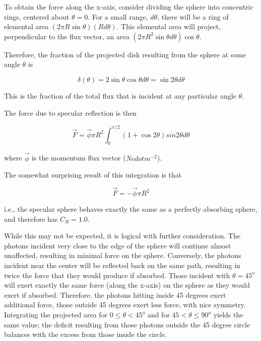 To obtain the force along the x-axis, consider dividing the sphere
into concentric rings, centered about $\theta = 0$.  For a small
range, $d\theta$, there will be a ring of elemental area
$(2 \pi R \sin \theta)(R d\theta)$.  This elemental area will
project, perpendicular to the flux vector, an area
$(2 \pi R^2 \sin \theta d \theta) \cos \theta$.

Therefore, the fraction of the projected disk resulting from the
sphere at some angle $\theta$ is

\begin{equation*}
\delta(\theta) = 2 \sin \theta \cos \theta d \theta = \sin 2 \theta d \theta
\end{equation*}

This is the fraction of the total flux that is incident at any
particular angle $\theta$.

The force due to specular reflection is then

\begin{equation*}
\vec F = \vec \phi \pi R^2 \int_{0}^{\pi/2} (1 + \cos 2\theta) sin 2\theta d\theta
\end{equation*}

where $\vec \phi$ is the momentum flux vector ($N cdot m^{-2}$).

The somewhat surprising result of this integration is that

\begin{equation*}
\vec F = - \vec \phi \pi R^2
\end{equation*}

i.e., the specular sphere behaves exactly the same as a perfectly
absorbing sphere, and therefore has $C_R = 1.0$.

While this may not be expected, it is logical with further consideration.
The photons incident very close to the edge of the sphere will
continue almost unaffected, resulting in minimal force on the
sphere.  Conversely, the photons incident near the center will
be reflected back on the same path, resulting in twice the force
that they would produce if absorbed.  Those incident with
$\theta = 45 ^o$ will exert exactly the same force (along
the x-axis) on the sphere as they would exert if absorbed.
Therefore, the photons hitting inside 45 degrees exert additional
force, those outside 45 degrees exert less force, with nice symmetry.
Integrating the projected area for $0 \leqslant \theta < 45^o$ and
for $45 < \theta \leqslant 90^o$ yields the same value; the deficit
resulting from those photons outside the 45 degree circle balances
with the excess from those inside the circle.

